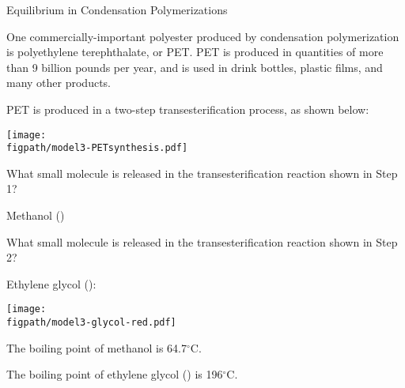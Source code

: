 \begin{activity}{Equilibrium in Condensation Polymerizations}
\begin{ctqs}
\begin{solution}[2in]{}
			\end{solution}
		
\end{ctqs}

\clearpage
\begin{model}
\label{\labelbase:mdl:PET}

One commercially-important polyester produced by condensation polymerization is polyethylene terephthalate, or PET.
PET is produced in quantities of more than 9 billion pounds per year, and is used in drink bottles, plastic films, and many other products.

PET is produced in a two-step transesterification process, as shown below:
	
		\vspace{0.1in}
		\centerline{\texttt{[image: \\figpath/model3-PETsynthesis.pdf]}}

\end{model}

\begin{ctqs}
		

			
		\question What small molecule is released in the transesterification reaction shown in Step 1?
		
			\begin{solution}[0.75in]{}
				Methanol ()
			\end{solution}
		
		\question What small molecule is released in the transesterification reaction shown in Step 2?
		
			\begin{solution}[0.75in]{}
				Ethylene glycol (\ce{HOCH2CH2OH}):
				
				\centerline{\texttt{[image: \\figpath/model3-glycol-red.pdf]}}
			\end{solution}
			
\end{ctqs}

\begin{infobox}
	
	The boiling point of methanol is 64.7${}^\circ$C.
	
	The boiling point of ethylene glycol () is 196${}^\circ$C.
	
\end{infobox}

\begin{ctqs}
	

\end{ctqs}
\end{activity}
